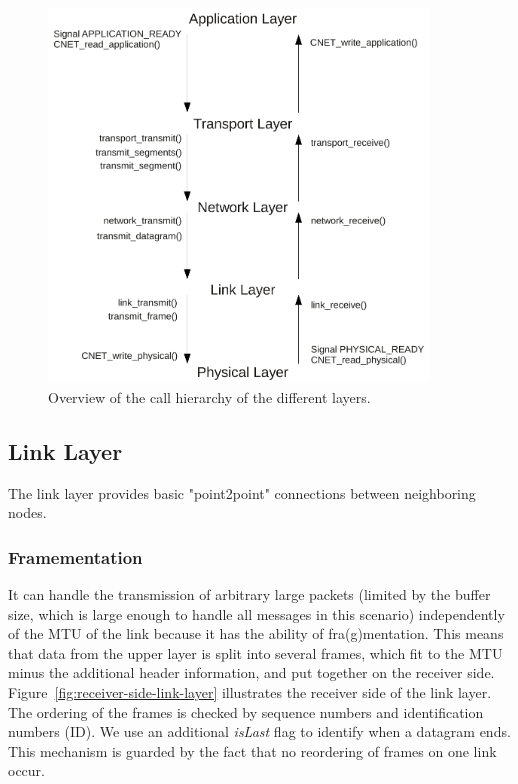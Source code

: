 \begin{figure}
  \centering
  \includegraphics[width=0.9\textwidth]{images/flowgraph_overview.pdf}
  \caption[Overview Layers]{ Overview of the call hierarchy of the different layers.}
  \label{fig:overview-layers}
\end{figure}


\subsection{Link Layer}
  The link layer provides basic "point2point" connections between neighboring nodes. 

  \subsubsection{Framementation}
  It can handle the transmission of arbitrary large packets (limited by the buffer size, which is large enough to handle all messages in this scenario) independently of the MTU of the link because it has the ability of fra(g)mentation. This means that data from the upper layer is split into several frames, which fit to the MTU minus the additional header information, and put together on the receiver side. Figure~\ref{fig:receiver-side-link-layer} illustrates the receiver side of the link layer. The ordering of the frames is checked by sequence numbers and identification numbers (ID). We use an additional \emph{isLast} flag to identify when a datagram ends. This mechanism is guarded by the fact that no reordering of frames on one link occur. 


